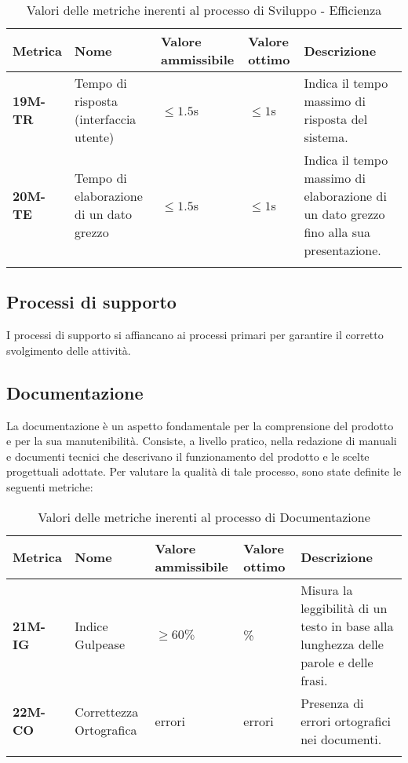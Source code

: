 \begin{longtable}{|>{\centering\arraybackslash}p{}|>{\centering\arraybackslash}p{}|>{\centering\arraybackslash}p{}|>{\centering\arraybackslash}p{}|>{\centering\arraybackslash}p{}|}
	\hline
	\textbf{Metrica}  & \textbf{Nome}                & \textbf{Valore ammissibile} & \textbf{Valore ottimo} & \textbf{Descrizione}\\
	\hline
	\endhead
	\textbf{19M-TR}  & Tempo di risposta (interfaccia utente)  & $\leq 1.5$s                 & $\leq 1$s              & Indica il tempo massimo di risposta del sistema.                                       \\
	\hline
	\textbf{20M-TE}  & Tempo di elaborazione di un dato grezzo & $\leq 1.5$s                 & $\leq 1$s              & Indica il tempo massimo di elaborazione di un dato grezzo fino alla sua presentazione. \\
	\hline
	\caption{ Valori delle metriche inerenti al processo di Sviluppo - Efficienza}
	\label{table:6}
\end{longtable}


\subsection{Processi di supporto}
I processi di supporto si affiancano ai processi primari per garantire il corretto svolgimento delle attività.
\subsection{Documentazione}
La documentazione è un aspetto fondamentale per la comprensione del prodotto e per la sua manutenibilità. Consiste,
a livello pratico, nella redazione di manuali e documenti tecnici che descrivano il funzionamento del prodotto e le
scelte progettuali adottate.
Per valutare la qualità di tale processo, sono state definite le seguenti metriche:
\begin{longtable}{|>{\centering\arraybackslash}p{}|>{\centering\arraybackslash}p{}|>{\centering\arraybackslash}p{}|>{\centering\arraybackslash}p{}|>{\centering\arraybackslash}p{}|}
	\hline
	\textbf{Metrica} & \textbf{Nome}           & \textbf{Valore ammissibile} & \textbf{Valore ottimo} & \textbf{Descrizione}                                                                 \\
	\hline
	\endfirsthead
	\textbf{21M-IG}  & Indice Gulpease         & $\geq 60\% $                & 90\%                   & Misura la leggibilità di un testo in base alla lunghezza delle parole e delle frasi. \\
	\hline
	\textbf{22M-CO}  & Correttezza Ortografica & 0 errori                    & 0 errori               & Presenza di errori ortografici nei documenti.                                        \\
	\hline
	\caption{ Valori delle metriche inerenti al processo di Documentazione}
	\label{table:7}
\end{longtable}

